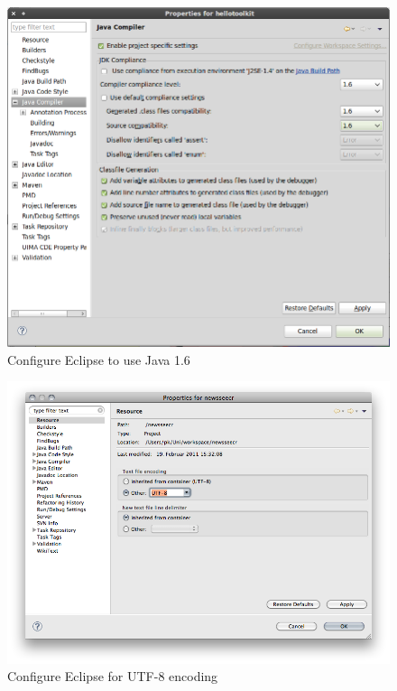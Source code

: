 \begin{figure}
\centering
\includegraphics[width=\textwidth]{img/ht09.png}
\caption{Configure Eclipse to use Java 1.6}
\label{fig:java603}
\end{figure}
\begin{figure}
\centering
\includegraphics[width=\textwidth]{img/ht16.png}
\caption{Configure Eclipse for UTF-8 encoding}
\label{fig:utf8}
\end{figure}
